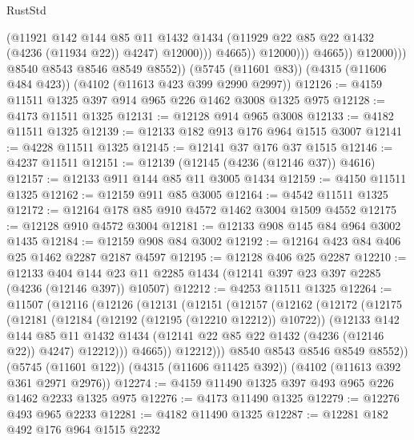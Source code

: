 \begin{lexlean}{RustStd}
\begin{coremodule}
                                (@11921
                                  @142
                                  @144
                                  @85
                                  @11
                                  @1432
                                  @1434
                                  (@11929 @22 @85 @22 @1432 (@4236 (@11934 @22)) @4247)
                                  @12000)))
                            @4665))
                        @12000)))
                  @4665))
              @12000)))
        @8540
        @8543
        @8546
        @8549
        @8552))
    (@5745 (@11601 @83))
    (@4315 (@11606 @484 @423))
    (@4102 (@11613 @423 @399 @2990 @2997))
@12126 := @4159 @11511 @1325 @397 @914 @965 @226 @1462 @3008 @1325 @975
@12128 := @4173 @11511 @1325
@12131 := @12128 @914 @965 @3008
@12133 := @4182 @11511 @1325
@12139 := @12133 @182 @913 @176 @964 @1515 @3007
@12141 := @4228 @11511 @1325
@12145 := @12141 @37 @176 @37 @1515
@12146 := @4237 @11511
@12151 := @12139 (@12145 (@4236 (@12146 @37)) @4616)
@12157 := @12133 @911 @144 @85 @11 @3005 @1434
@12159 := @4150 @11511 @1325
@12162 := @12159 @911 @85 @3005
@12164 := @4542 @11511 @1325
@12172 := @12164 @178 @85 @910 @4572 @1462 @3004 @1509 @4552
@12175 := @12128 @910 @4572 @3004
@12181 := @12133 @908 @145 @84 @964 @3002 @1435
@12184 := @12159 @908 @84 @3002
@12192 := @12164 @423 @84 @406 @25 @1462 @2287 @2187 @4597
@12195 := @12128 @406 @25 @2287
@12210 := @12133
    @404
    @144
    @23
    @11
    @2285
    @1434
    (@12141 @397 @23 @397 @2285 (@4236 (@12146 @397)) @10507)
@12212 := @4253 @11511 @1325
@12264 := @11507
    (@12116
      (@12126
        (@12131
          (@12151
            (@12157
              (@12162
                (@12172
                  (@12175
                    (@12181
                      (@12184 (@12192 (@12195 (@12210 @12212)) @10722))
                      (@12133
                        @142
                        @144
                        @85
                        @11
                        @1432
                        @1434
                        (@12141 @22 @85 @22 @1432 (@4236 (@12146 @22)) @4247)
                        @12212)))
                  @4665))
              @12212)))
        @8540
        @8543
        @8546
        @8549
        @8552))
    (@5745 (@11601 @122))
    (@4315 (@11606 @11425 @392))
    (@4102 (@11613 @392 @361 @2971 @2976))
@12274 := @4159 @11490 @1325 @397 @493 @965 @226 @1462 @2233 @1325 @975
@12276 := @4173 @11490 @1325
@12279 := @12276 @493 @965 @2233
@12281 := @4182 @11490 @1325
@12287 := @12281 @182 @492 @176 @964 @1515 @2232

\end{coremodule}
\end{lexlean}
